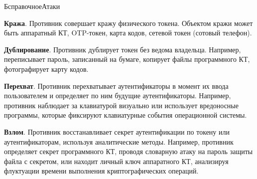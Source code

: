 \begin{appendix}{Б}{справочное}{Атаки}
\label{ATK.TI}

{\bf Кража}. 
Противник совершает кражу физического токена. Объектом кражи может быть
аппаратный КТ, OTP-токен, карта кодов, сетевой токен (сотовый телефон).


%

{\bf Дублирование}. 
Противник дублирует токен без ведома владельца.
%
Например, переписывает пароль, записанный на бумаге,
копирует файлы программного КТ, фотографирует карту кодов.


{\bf Перехват}. 
Противник перехватывает аутентификаторы
в момент их ввода пользователем и определяет по ним будущие аутентификаторы.
%
Например, противник наблюдает за клавиатурой визуально или использует 
вредоносные программы, которые фиксируют клавиатурные события 
операционной системы. 


{\bf Взлом}. 
Противник восстанавливает секрет аутентификации по токену или 
аутентификаторам, используя аналитические методы.
%
Например, противник определяет секрет программного КТ,
проводя словарную атаку на пароль защиты файла с секретом,
или находит личный ключ аппаратного КТ, анализируя флуктуации времени 
выполнения криптографических операций. 



\end{appendix}
